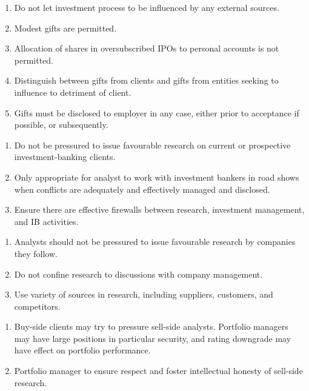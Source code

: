 \begin{remark} 
\begin{enumerate}[label=\roman*.]
\setlength{\itemsep}{0pt}
\item Do not let investment process to be influenced by any external sources. 
\item Modest gifts are permitted.
\item Allocation of shares in oversubscribed IPOs to personal accounts is not permitted.
\item Distinguish between gifts from clients and gifts from entities seeking to influence to detriment of client.
\item Gifts must be disclosed to employer in any case, either prior to acceptance if possible, or subsequently.
\end{enumerate}
\end{remark} 

\begin{remark} 
\begin{enumerate}[label=\roman*.]
\setlength{\itemsep}{0pt}
\item Do not be pressured to issue favourable research on current or prospective investment-banking clients.
\item Only appropriate for analyst to work with investment bankers in road shows when conflicts are adequately and effectively managed and disclosed.
\item Ensure there are effective firewalls between research, investment management, and IB activities.
\end{enumerate}
\end{remark}

\begin{remark} 
\begin{enumerate}[label=\roman*.]
\setlength{\itemsep}{0pt}
\item Analysts should not be pressured to issue favourable research by companies they follow.
\item Do not confine research to discussions with company management.
\item Use variety of sources in research, including suppliers, customers, and competitors.
\end{enumerate}
\end{remark}

\begin{remark} 
\begin{enumerate}[label=\roman*.]
\setlength{\itemsep}{0pt}
\item Buy-side clients may try to pressure sell-side analysts. Portfolio managers may have large positions in particular security, and rating downgrade may have effect on portfolio performance.
\item Portfolio manager to ensure respect and foster intellectual honesty of sell-side research.
\end{enumerate}
\end{remark}

